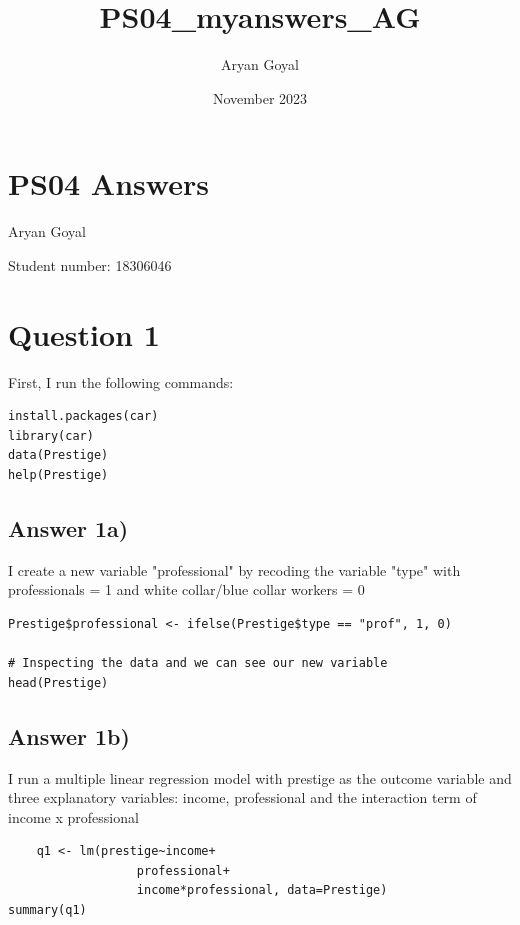 \documentclass{article}
\title{PS04_myanswers_AG}
\author{Aryan Goyal}
\date{November 2023}
\begin{document}
\section{PS04 Answers}
Aryan Goyal

\noindent Student number: 18306046
\vspace{0.2cm}

\section{Question 1}
First, I run the following commands:
\begin{verbatim}
install.packages(car)
library(car)
data(Prestige)
help(Prestige)    
\end{verbatim}

\subsection{Answer 1a)}
I create a new variable "professional" by recoding the variable "type"
with professionals = 1 and white collar/blue collar workers = 0

\begin{verbatim}
Prestige$professional <- ifelse(Prestige$type == "prof", 1, 0)

# Inspecting the data and we can see our new variable
head(Prestige) 

\end{verbatim}

\subsection{Answer 1b)}
I run a multiple linear regression model with prestige as the outcome variable and three explanatory variables: income, professional and the interaction term of income x professional

\begin{verbatim}
    q1 <- lm(prestige~income+
                  professional+
                  income*professional, data=Prestige) 
summary(q1) 
\end{verbatim}
\end{document}
